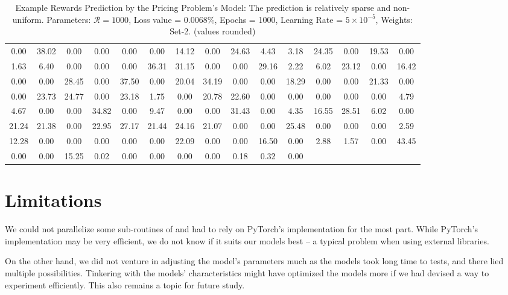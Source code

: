 \begin{table}[!htbp]
    \centering
    \caption[Example Rewards Prediction by the Pricing Problem's Model]{Example Rewards Prediction by the Pricing Problem's Model: The prediction is relatively sparse and non-uniform. Parameters: $\mathcal{R} = 1000$, Loss value = $0.0068\%$, Epochs = 1000, Learning Rate = $5 \times 10^{-5}$, Weights: Set-2. (values rounded)}
    \label{tab:Example Rewards Prediction by the Pricing Problem's Model}
    \setlength\tabcolsep{2pt}
    \begin{tabular}{|*{15}{c}|}
        \hline
        0.00 & 38.02 & 0.00 & 0.00 & 0.00 & 0.00 & 14.12 & 0.00 & 24.63 & 4.43 & 3.18 & 24.35 & 0.00 & 19.53 & 0.00\\
        1.63 & 6.40 & 0.00 & 0.00 & 0.00 & 36.31 & 31.15 & 0.00 & 0.00 & 29.16 & 2.22 & 6.02 & 23.12 & 0.00 & 16.42\\
        0.00 & 0.00 & 28.45 & 0.00 & 37.50 & 0.00 & 20.04 & 34.19 & 0.00 & 0.00 & 18.29 & 0.00 & 0.00 & 21.33 & 0.00\\
        0.00 & 23.73 & 24.77 & 0.00 & 23.18 & 1.75 & 0.00 & 20.78 & 22.60 & 0.00 & 0.00 & 0.00 & 0.00 & 0.00 & 4.79\\
        4.67 & 0.00 & 0.00 & 34.82 & 0.00 & 9.47 & 0.00 & 0.00 & 31.43 & 0.00 & 4.35 & 16.55 & 28.51 & 6.02 & 0.00\\
        21.24 & 21.38 & 0.00 & 22.95 & 27.17 & 21.44 & 24.16 & 21.07 & 0.00 & 0.00 & 25.48 & 0.00 & 0.00 & 0.00 & 2.59\\
        12.28 & 0.00 & 0.00 & 0.00 & 0.00 & 0.00 & 22.09 & 0.00 & 0.00 & 16.50 & 0.00 & 2.88 & 1.57 & 0.00 & 43.45\\
        0.00 & 0.00 & 15.25 & 0.02 & 0.00 & 0.00 & 0.00 & 0.00 & 0.18 & 0.32 & 0.00&&&&\\ \hline
    \end{tabular}
\end{table}

\section{Limitations} \label{sec:Limitations}
We could not parallelize some sub-routines of  and had to rely on PyTorch's implementation for the most part. While PyTorch's implementation \cite{PTDocs} may be very efficient, we do not know if it suits our models best -- a typical problem when using external libraries.

On the other hand, we did not venture in adjusting the model's parameters much as the models took long time to tests, and there lied multiple possibilities. Tinkering with the models' characteristics might have optimized the models more if we had devised a way to experiment efficiently. This also remains a topic for future study.

